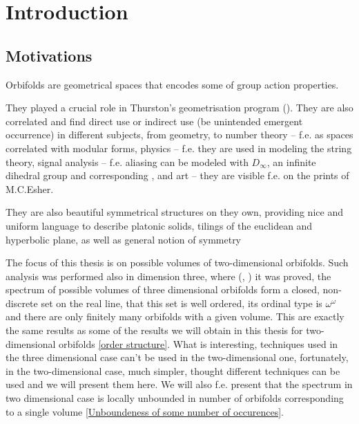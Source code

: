 \chapter{Introduction}
\setcounter{page}{9}
\section{Motivations}
Orbifolds are geometrical spaces that encodes some of group action properties. 

They played a crucial role in Thurston's geometrisation program (\cite{Thurston1979}). 
They are also correlated and find direct use or indirect use (be unintended 
emergent occurrence) 
in different subjects, 
from geometry, to number theory -- f.e. as spaces correlated with modular forms, 
physics -- f.e. they are used in modeling the string theory, 
signal analysis -- f.e. aliasing can be modeled with $D_\infty$, an 
infinite dihedral group and corresponding , and art -- they are visible f.e. 
on the prints of M.C.Esher.  

They are also beautiful symmetrical structures on they own, providing 
nice 
and uniform language to describe platonic solids, tilings of the euclidean 
and hyperbolic plane, 
as well as general notion of symmetry


The focus of this thesis is on possible volumes of two-dimensional orbifolds.
Such analysis was performed also in dimension three, where 
(\cite{Thurston1979}, \cite{Gromov1981}) it was proved, the spectrum of possible volumes 
of three dimensional orbifolds form a closed, non-discrete set on the real line, 
that this set is well ordered, its ordinal type is $\omega^\omega$ and there are 
only finitely many orbifolds with a given volume. This are exactly the same results 
as some of the results we will obtain in this thesis for two-dimensional orbifolds 
\ref{order structure}. 
What is interesting, techniques used in the three dimensional case can't be used in the 
two-dimensional one, fortunately, in the two-dimensional case, much simpler, 
thought different techniques can be used and we will present them here. 
We will also f.e. present that the spectrum in two dimensional case is locally unbounded 
in number of orbifolds corresponding to a single volume 
\ref{Unboundeness of some number of occurences}. 

